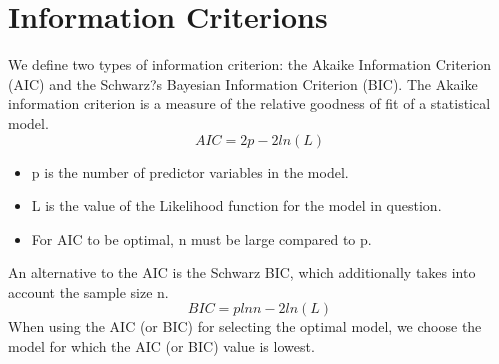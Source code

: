 \documentclass[a4paper,12pt]{article}
\begin{document}
\section{Information Criterions}
We define two types of information criterion: the Akaike Information Criterion (AIC) and the
Schwarz?s Bayesian Information Criterion (BIC). The Akaike information criterion is a measure
of the relative goodness of fit of a statistical model.
\[AIC = 2p - 2 ln(L)\]


\begin{itemize}
	\item p is the number of predictor variables in the model.
	\item L is the value of the Likelihood function for the model in question.
	\item For AIC to be optimal, n must be large compared to p.
\end{itemize}

An alternative to the AIC is the Schwarz BIC, which additionally takes into account the
sample size n.
\[BIC = p ln n - 2 ln(L)\]
When using the AIC (or BIC) for selecting the optimal model, we choose the model for which
the AIC (or BIC) value is lowest.
\end{document}
